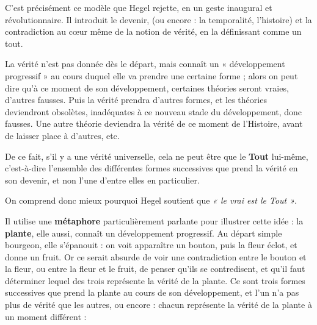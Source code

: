 C’est précisément ce modèle que Hegel rejette, en un geste inaugural et révolutionnaire. Il introduit le devenir, (ou encore : la temporalité, l’histoire) et la contradiction au cœur même de la notion de vérité, en la définissant comme un tout.

La vérité n’est pas donnée dès le départ, mais connaît un « développement progressif » au cours duquel elle va prendre une certaine forme ; alors on peut dire qu’à ce moment de son développement, certaines théories seront vraies, d’autres fausses. Puis la vérité prendra d’autres formes, et les théories deviendront obsolètes, inadéquates à ce nouveau stade du développement, donc fausses. Une autre théorie deviendra la vérité de ce moment de l’Histoire, avant de laisser place à d’autres, etc.

De ce fait, s’il y a une vérité universelle, cela ne peut être que le {\bf Tout} lui-même, c’est-à-dire l’ensemble des différentes formes successives que prend la vérité en son devenir, et non l’une d’entre elles en particulier.

On comprend donc mieux pourquoi Hegel soutient que {\it « le vrai est le Tout »}.

Il utilise une {\bf métaphore} particulièrement parlante pour illustrer cette idée : la {\bf plante}, elle aussi, connaît un développement progressif. Au départ simple bourgeon, elle s’épanouit : on voit apparaître un bouton, puis la fleur éclot, et donne un fruit. Or ce serait absurde de voir une contradiction entre le bouton et la fleur, ou entre la fleur et le fruit, de penser qu’ils se contredisent, et qu’il faut déterminer lequel des trois représente la vérité de la plante. Ce sont trois formes successives que prend la plante au cours de son développement, et l’un n’a pas plus de vérité que les autres, ou encore : chacun représente la vérité de la plante à un moment différent :

\begin{center}
\setlength{\fboxsep}{3mm}
\end{center}

